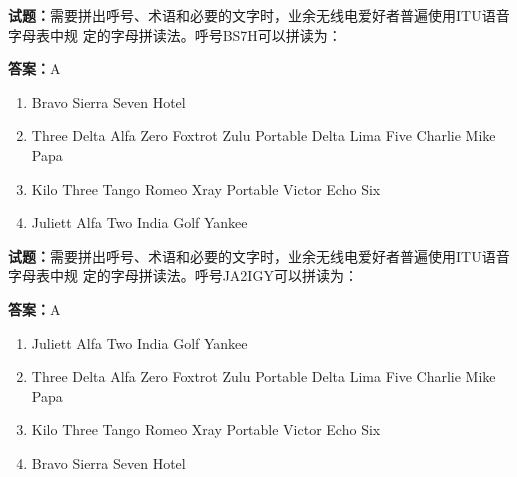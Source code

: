 \documentclass{ctexbook}
\begin{document}




\vspace{1em}

\textbf{试题：}需要拼出呼号、术语和必要的文字时，业余无线电爱好者普遍使用ITU语音字母表中规
定的字母拼读法。呼号BS7H可以拼读为： 

\textbf{答案：}A 

\begin{enumerate}[leftmargin=3em]
  \item Bravo Sierra Seven Hotel 

  \item Three Delta Alfa Zero Foxtrot Zulu Portable Delta Lima Five Charlie Mike Papa 

  \item Kilo Three Tango Romeo Xray Portable Victor Echo Six 

  \item Juliett Alfa Two India Golf Yankee 

\end{enumerate}





\vspace{1em}

\textbf{试题：}需要拼出呼号、术语和必要的文字时，业余无线电爱好者普遍使用ITU语音字母表中规
定的字母拼读法。呼号JA2IGY可以拼读为： 

\textbf{答案：}A 

\begin{enumerate}[leftmargin=3em]
  \item Juliett Alfa Two India Golf Yankee 

  \item Three Delta Alfa Zero Foxtrot Zulu Portable Delta Lima Five Charlie Mike Papa 

  \item Kilo Three Tango Romeo Xray Portable Victor Echo Six 

  \item Bravo Sierra Seven Hotel 

\end{enumerate}





\vspace{1em}
\end{document}
